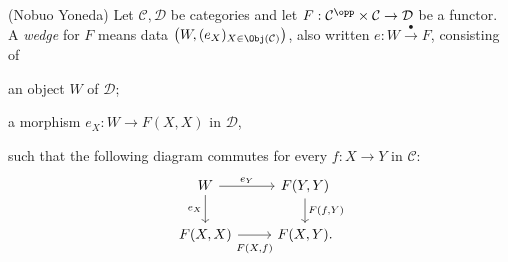 \begin{Exercises}
	\item (Nobuo Yoneda) Let $\mathcal{C},\mathcal{D}$ be categories and let $F:\mathcal{C}^{\opp}\times\mathcal{C}\to\mathcal{D}$ be a functor. A \emph{wedge} for $F$ means data
	$\left(W,(e_X)_{X\in\Obj(\mathcal{C})}\right)$, also written $e:W\xrightarrow{\bullet}F$, consisting of
	\begin{compactitem}
		\item an object $W$ of $\mathcal{D}$;
		\item a morphism $e_X:W\to F(X,X)$ in $\mathcal{D}$,
	\end{compactitem}
	such that the following diagram commutes for every $f:X\to Y$ in $\mathcal{C}$:
	\[\begin{tikzcd}
		W \arrow[r, "e_Y"] \arrow[d, "e_X"'] & F(Y, Y) \arrow[d, "{F(f, Y)}"] \\
		F(X, X) \arrow[r, "{F(X, f)}"' inner sep=0.6em] & F(X, Y).
	\end{tikzcd}\]


\end{Exercises}
